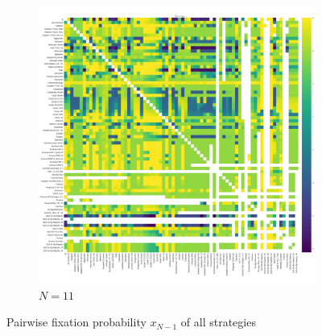 \documentclass{article}
\begin{document}
\begin{figure}[!hbtp]
    \begin{subfigure}[t]{.3\textwidth}
        \centering
        \includegraphics[width=.8\textwidth]{../img/fixation_heatmap_11_resist.pdf}
        \caption{\(N=11\)}

    \end{subfigure}%

    \caption{Pairwise fixation probability \(x_{N-1}\) of all strategies}
    \label{fig:fixation_heatmap_resist}
\end{figure}
\end{document}
